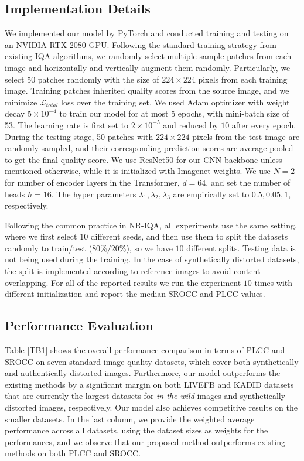 \documentclass[10pt,twocolumn,letterpaper]{article}
\begin{document}
\subsection{Implementation Details}
We implemented our model by PyTorch and conducted training and testing on an NVIDIA RTX 2080 GPU. Following the standard training strategy from existing IQA algorithms, we randomly select multiple sample patches from each image and horizontally and vertically augment them randomly. 
Particularly, we select 50 patches randomly with the size of $224\times 224$ pixels from each training image. 
Training patches inherited quality scores from the source image, and we minimize $\mathcal{L}_{total}$ loss over the training set.
We used Adam \cite{kingma2014adam} optimizer with weight decay $5 \times 10^{-4}$ to train our model for at most 5 epochs, with mini-batch size of 53. 
The learning rate is first set to $2 \times 10^{-5}$  and reduced by $10$ after every  epoch.
During the testing stage, 50 patches with $224\times 224$ pixels from the test image are randomly sampled, and their corresponding prediction scores are average pooled to get the final quality score.
We use ResNet50 \cite{he2016deep} for our CNN backbone  unless mentioned otherwise, while it is initialized with Imagenet weights.
We use $N=2$ for number of encoder layers in the Transformer, $d=64$, and set the number of heads $h=16$.
The hyper parameters $\lambda_{1},\lambda_{2},\lambda_{3}$ are empirically set to  $0.5,0.05,1$, respectively.

Following the common practice in NR-IQA,   all experiments use the same setting,  where we first select $10$ different seeds, and  then  use  them  to  split  the  datasets  randomly  to train/test ($80\%/20\%$),  so we have $10$ different splits.   Testing data is not being used during the training.
In the case of synthetically distorted datasets, the split is implemented according to reference images to avoid content overlapping. 
For all of the reported results we
run the experiment $10$ times with different  initialization and report the median SROCC and PLCC values.


\subsection{Performance Evaluation}
Table \ref{TB1} shows the overall performance comparison in terms of PLCC and SROCC on seven standard image quality datasets, which cover both synthetically and authentically distorted images. 
Furthermore, our model outperforms the existing methods by a significant margin on both LIVEFB and KADID  datasets that are currently the largest datasets for \textit{in-the-wild} images and synthetically distorted images, respectively.
Our model also achieves  competitive results on the smaller datasets.
In the last column, we provide the weighted average  performance across all datasets, using the dataset sizes as  weights for the performances, and we observe that our proposed method outperforms existing methods on both PLCC and SROCC.
\end{document}
